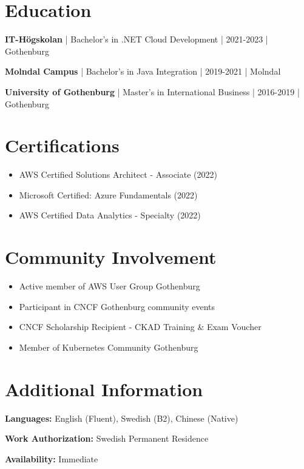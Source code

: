 \documentclass[11pt,a4paper]{article}
\begin{document}
\section*{Education}

\textbf{IT-Högskolan} | Bachelor's in .NET Cloud Development | 2021-2023 | Gothenburg

\textbf{Molndal Campus} | Bachelor's in Java Integration | 2019-2021 | Molndal

\textbf{University of Gothenburg} | Master's in International Business | 2016-2019 | Gothenburg

\section*{Certifications}

\begin{itemize}[leftmargin=*, itemsep=2pt]
\item AWS Certified Solutions Architect - Associate (2022)
\item Microsoft Certified: Azure Fundamentals (2022)
\item AWS Certified Data Analytics - Specialty (2022)
\end{itemize}

\section*{Community Involvement}

\begin{itemize}[leftmargin=*, itemsep=2pt]
\item Active member of AWS User Group Gothenburg
\item Participant in CNCF Gothenburg community events
\item CNCF Scholarship Recipient - CKAD Training \& Exam Voucher
\item Member of Kubernetes Community Gothenburg
\end{itemize}

\section*{Additional Information}

\textbf{Languages:} English (Fluent), Swedish (B2), Chinese (Native)

\textbf{Work Authorization:} Swedish Permanent Residence

\textbf{Availability:} Immediate
\end{document}
